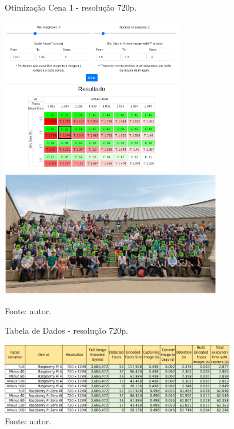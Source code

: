 \begin{figure}[H]
    \centering
    \caption[Otimização Cena 1 - resolução 720p.]{Otimização Cena 1 - resolução 720p.}
    \includegraphics[width=0.70\textwidth]{Cap4_Experimentos_Realizados/Figures/cena1_param_720p_matriz.jpg}
    \includegraphics[width=0.85\textwidth]{Cap4_Experimentos_Realizados/Figures/cena1_param_720p_faces.jpg}
    \caption*{Fonte: autor.}
    \label{fig:otimizacaoCena1_720p}
\end{figure}

\begin{figure}
    \centering
    \caption[Tabela de Dados - resolução 720p.]{Tabela de Dados - resolução 720p.}
    \includegraphics[width=0.90\textwidth]{Cap4_Experimentos_Realizados/Figures/cena1_dados_720p.jpg}
    \caption*{Fonte: autor.}
    \label{fig:dadosCena1_720p}
\end{figure}

